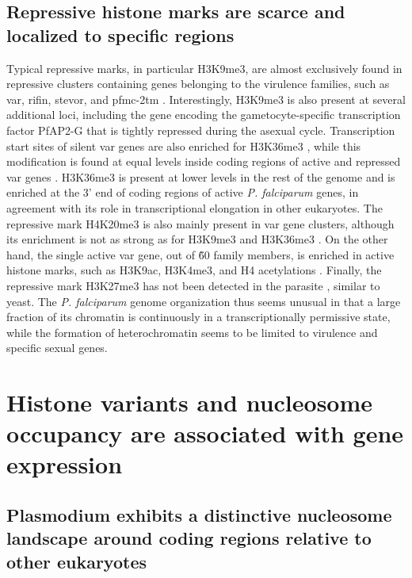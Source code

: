 \subsection{Repressive histone marks are scarce and localized to specific
regions}

Typical repressive marks, in particular H3K9me3, are almost exclusively found
in repressive clusters containing genes belonging to the virulence families,
such as var, rifin, stevor, and pfmc-2tm \citep{lopez-rubio:genome-wide,
jiang:pfsetvs, chookajorn:epigenetic, lopez-rubio:5}. Interestingly, H3K9me3
is also present at several additional loci, including the gene encoding the
gametocyte-specific transcription factor PfAP2-G
\citep{lopez-rubio:genome-wide} that is tightly
repressed during the asexual cycle. Transcription start sites of silent var
genes are also enriched for H3K36me3 \citep{jiang:pfsetvs},
while this modification is found at
equal levels inside coding regions of active and repressed var genes
\citep{jiang:pfsetvs, ukaegbu:recruitment}.
H3K36me3 is present at lower levels in the rest of the genome and is enriched
at the 3’ end of coding regions of active \textit{P. falciparum} genes, in
agreement with its role in transcriptional elongation in other eukaryotes. The
repressive mark H4K20me3 is also mainly present in var gene clusters, although
its enrichment is not as strong as for H3K9me3 and H3K36me3
\citep{jiang:pfsetvs}. On the other
hand, the single active var gene, out of \~60 family members, is enriched in
active histone marks, such as H3K9ac, H3K4me3, and H4 acetylations
\citep{jiang:pfsetvs, lopez-rubio:5}.
Finally, the repressive mark H3K27me3 has not been detected in the parasite
\citep{trelle:global}, similar to yeast. 
The \textit{P. falciparum} genome organization thus seems
unusual in that a large fraction of its chromatin is continuously in a
transcriptionally permissive state, while the formation of heterochromatin
seems to be limited to virulence and specific sexual genes.

\section{Histone variants and nucleosome occupancy are associated with gene
expression}

\subsection{Plasmodium exhibits a distinctive nucleosome landscape around
coding regions relative to other eukaryotes}

